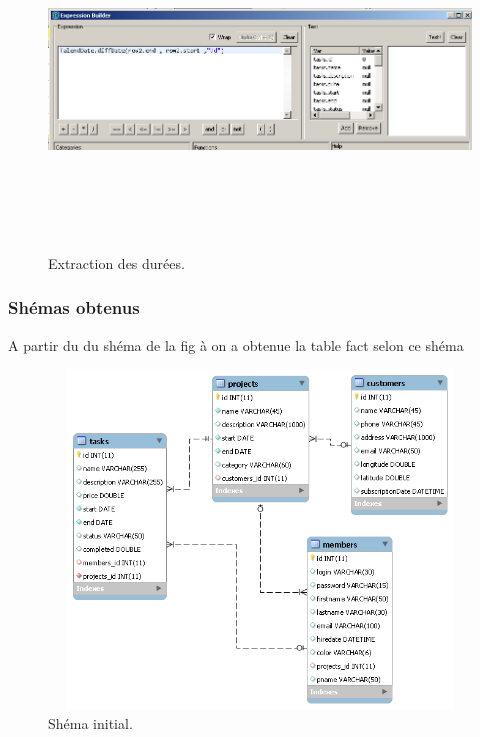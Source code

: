 \begin{figure}[H]
\center
\includegraphics[width=14cm,height=9cm]{./figures/integ2.png}
\caption{Extraction des  dur\'{e}es.}
\end{figure}





\subsubsection{Sh\'{e}mas obtenus}
A partir du du sh\'{e}ma de la fig \`{a} on a obtenue la table fact selon ce shéma


\begin{figure}[H]
\center
\includegraphics[width=14cm,height=9cm]{./figures/s1.png}
\caption{Sh\'{e}ma initial.}
\end{figure}


